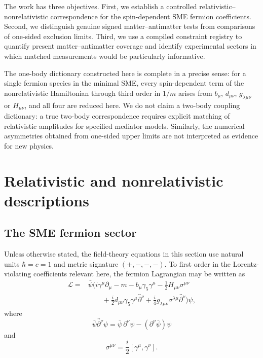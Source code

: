 \documentclass[aps,prd,reprint,superscriptaddress,nofootinbib]{revtex4-2}
\begin{document}
	The work has three objectives. First, we establish a controlled
	relativistic--nonrelativistic correspondence for the spin-dependent SME fermion
	coefficients. Second, we distinguish genuine signed matter--antimatter
	tests from comparisons of one-sided exclusion limits. Third, we use a
	compiled constraint registry to quantify present matter--antimatter
	coverage and identify experimental sectors in which matched
	measurements would be particularly informative.
	
	The one-body dictionary constructed here is complete in a precise
sense: for a single fermion species in the minimal SME, every
spin-dependent term of the nonrelativistic Hamiltonian through third
order in $1/m$ arises from $b_\mu$, $d_{\mu\nu}$, $g_{\lambda\mu\nu}$ or
$H_{\mu\nu}$, and all four are reduced here. We do not claim a two-body
coupling dictionary: a true two-body correspondence requires explicit
matching of relativistic amplitudes for specified mediator models. Similarly, the numerical asymmetries
	obtained from one-sided upper limits are not interpreted as evidence for
	new physics.
	
	\section{Relativistic and nonrelativistic descriptions}
	
	\subsection{The SME fermion sector}
	
	Unless otherwise stated, the field-theory equations in this section use
	natural units $\hbar=c=1$ and metric signature $(+,-,-,-)$. To first
	order in the Lorentz-violating coefficients relevant here, the fermion
	Lagrangian may be written as
	\begin{equation}
		\begin{aligned}
			\mathcal{L}
			={}&\bar\psi\Big(
			i\gamma^\mu\partial_\mu-m
			-b_\mu\gamma_5\gamma^\mu
			-\tfrac{1}{2}H_{\mu\nu}\sigma^{\mu\nu}\\
			&\qquad+\tfrac{i}{2}d_{\mu\nu}
			\gamma_5\gamma^\mu
			\overleftrightarrow{\partial^\nu}
			+\tfrac{i}{4}g_{\lambda\mu\nu}
			\sigma^{\lambda\mu}
			\overleftrightarrow{\partial^\nu}
			\Big)\psi ,
		\end{aligned}
		\label{eq:SMEL}
	\end{equation}
	where
	\begin{equation}
		\bar\psi\overleftrightarrow{\partial^\nu}\psi
		=
		\bar\psi\,\partial^\nu\psi
		-
		(\partial^\nu\bar\psi)\psi
	\end{equation}
	and
	\begin{equation}
		\sigma^{\mu\nu}
		=
		\frac{i}{2}[\gamma^\mu,\gamma^\nu].
	\end{equation}
	
\end{document}
